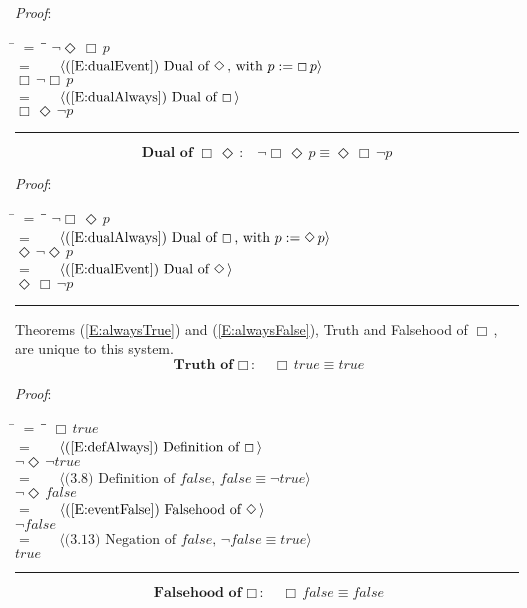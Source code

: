 \documentclass[12pt, fleqn, leqno]{article}
\newcommand{\lgap}{2pt}                             %
\newcommand{\mymathindent}{24pt}                    %
\newcommand{\Event}{\Diamond\,}
\newcommand{\Always}{\Box\,}
\newcommand{\myqed}{\rule[-.23ex]{1.2ex}{2.0ex}}
\newcommand{\myqedtab}{\hspace{384pt}}              %
\newcommand{\Gll} {\langle}                         %
\newcommand{\Ggg} {\rangle}                         %
\newcommand{\Hint}[1]     {\ \ \ $\Gll              \mbox{#1} \Ggg$ }   %
\begin{document}
\emph{Proof}:
\begin{tabbing}
\hspace{\mymathindent} \= $= \;$ \= \myqedtab \= \kill
  \> \>   $\neg \Event\Always p$\\[\lgap]
  \> $=$  \>  \Hint{(\ref{E:dualEvent}) Dual of $\Event$, with $p:=\Always p$}\\[\lgap]
  \> \>   $\Always \neg \Always p$\\[\lgap]
  \> $=$ \> \Hint{(\ref{E:dualAlways}) Dual of $\Always$}\\[\lgap]
  \> \>   $\Always\Event \neg p$ \quad \myqed
\end{tabbing}
\begin{equation}\label{E:dualAlwaysEvent}
\textbf{Dual of $\Always \Event$:}\quad \neg \Always\Event p \equiv \Event \Always\neg p
\end{equation}

\emph{Proof}:
\begin{tabbing}
\hspace{\mymathindent} \= $= \;$ \= \myqedtab \= \kill
  \> \>   $\neg \Always\Event p$\\[\lgap]
  \> $=$  \>  \Hint{(\ref{E:dualAlways}) Dual of $\Always$, with $p:=\Event p$}\\[\lgap]
  \> \>   $\Event \neg \Event p$\\[\lgap]
  \> $=$ \> \Hint{(\ref{E:dualEvent}) Dual of $\Event$}\\[\lgap]
  \> \>   $\Event\Always \neg p$ \quad \myqed
\end{tabbing}

Theorems (\ref{E:alwaysTrue}) and (\ref{E:alwaysFalse}), Truth and Falsehood of $\Always$, are unique to this system.
\begin{equation}\label{E:alwaysTrue}
\textbf{Truth of $\Always$:}\quad \Always true \equiv true
\end{equation}

\emph{Proof}:
\begin{tabbing}
\hspace{\mymathindent} \= $= \;$ \= \myqedtab \= \kill
  \> \>   $\Always true$\\[\lgap]
  \> $=$  \>  \Hint{(\ref{E:defAlways}) Definition of $\Always$}\\[\lgap]
  \> \>   $\neg\Event\neg true$\\[\lgap]
  \> $=$  \>  \Hint{(3.8) Definition of $false$, $false\equiv \neg true$}\\[\lgap]
  \> \>   $\neg\Event false$\\[\lgap]
  \> $=$  \>  \Hint{(\ref{E:eventFalse}) Falsehood of $\Event$}\\[\lgap]
  \> \>   $\neg false$\\[\lgap]
  \> $=$  \>  \Hint{(3.13) Negation of $false$, $\neg false\equiv true$}\\[\lgap]
  \> \>   $true$ \quad \myqed
\end{tabbing}
\begin{equation}\label{E:alwaysFalse}
\textbf{Falsehood of $\Always$:}\quad \Always false \equiv false
\end{equation}
\end{document}
